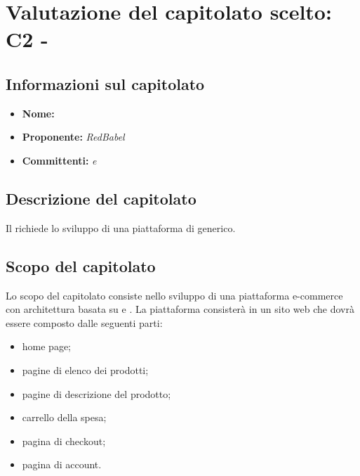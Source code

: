\section{Valutazione del capitolato scelto: C2 - \NomeProgetto}
\subsection{Informazioni sul capitolato}
\begin{itemize}
	\item \textbf{Nome:} \textit{\NomeProgetto}
	\item \textbf{Proponente:} \textit{RedBabel}
	\item \textbf{Committenti:} \textit{\VT{} e \CR{}}
\end{itemize}

\subsection{Descrizione del capitolato}
Il  richiede lo sviluppo di una piattaforma di  generico.

\subsection{Scopo del capitolato}
Lo scopo del capitolato consiste nello sviluppo di una piattaforma e-commerce con architettura basata su  e .
La piattaforma consisterà in un sito web che dovrà essere composto dalle seguenti parti:
\begin{itemize}
	\item home page;
	\item pagine di elenco dei prodotti;
	\item pagine di descrizione del prodotto;
	\item carrello della spesa;
	\item pagina di checkout;
	\item pagina di account.
\end{itemize}

